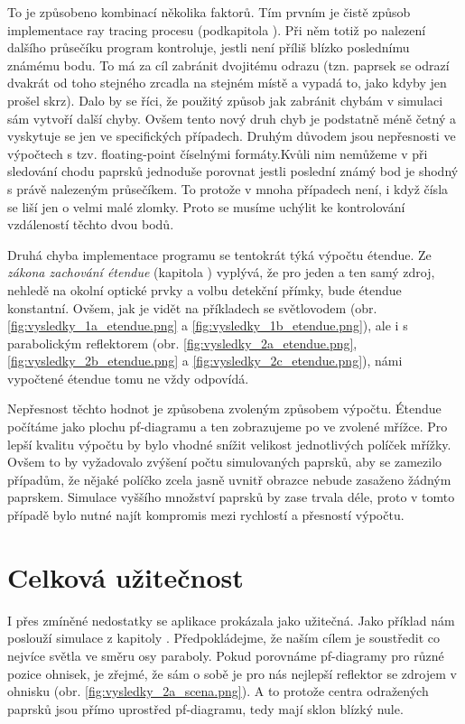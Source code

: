 To je způsobeno kombinací několika faktorů. Tím prvním je čistě způsob implementace ray tracing procesu (podkapitola ). Při něm totiž po nalezení dalšího průsečíku program kontroluje, jestli není příliš blízko poslednímu známému bodu. To má za cíl zabránit dvojitému odrazu (tzn. paprsek se odrazí dvakrát od toho stejného zrcadla na stejném místě a vypadá to, jako kdyby jen prošel skrz). Dalo by se říci, že použitý způsob jak zabránit chybám v simulaci sám vytvoří další chyby. Ovšem tento nový druh chyb je podstatně méně četný a vyskytuje se jen ve specifických případech. Druhým důvodem jsou nepřesnosti ve výpočtech s tzv. floating-point číselnými formáty.\src Kvůli nim nemůžeme v při sledování chodu paprsků jednoduše porovnat jestli poslední známý bod je shodný s právě nalezeným průsečíkem. To protože v mnoha případech není, i když čísla se liší jen o velmi malé zlomky. Proto se musíme uchýlit ke kontrolování vzdáleností těchto dvou bodů.

Druhá chyba implementace programu se tentokrát týká výpočtu étendue. Ze \emph{zákona zachování étendue} (kapitola ) vyplývá, že pro jeden a ten samý zdroj, nehledě na okolní optické prvky a volbu detekční přímky, bude étendue konstantní. Ovšem, jak je vidět na příkladech se světlovodem (obr. \ref{fig:vysledky_1a_etendue.png} a \ref{fig:vysledky_1b_etendue.png}), ale i s parabolickým reflektorem (obr. \ref{fig:vysledky_2a_etendue.png}, \ref{fig:vysledky_2b_etendue.png} a \ref{fig:vysledky_2c_etendue.png}), námi vypočtené étendue tomu ne vždy odpovídá.

Nepřesnost těchto hodnot je způsobena zvoleným způsobem výpočtu. Étendue počítáme jako plochu pf-diagramu a ten zobrazujeme po ve zvolené mřížce. Pro lepší kvalitu výpočtu by bylo vhodné snížit velikost jednotlivých políček mřížky. Ovšem to by vyžadovalo zvýšení počtu simulovaných paprsků, aby se zamezilo případům, že nějaké políčko zcela jasně uvnitř obrazce nebude zasaženo žádným paprskem. Simulace vyššího množství paprsků by zase trvala déle, proto v tomto případě bylo nutné najít kompromis mezi rychlostí a přesností výpočtu.


\section{Celková užitečnost}

I přes zmíněné nedostatky se aplikace prokázala jako užitečná. Jako příklad nám poslouží simulace z kapitoly . Předpokládejme, že naším cílem je soustředit co nejvíce světla ve směru osy paraboly. Pokud porovnáme pf-diagramy pro různé pozice ohnisek, je zřejmé, že sám o sobě je pro nás nejlepší reflektor se zdrojem v ohnisku (obr. \ref{fig:vysledky_2a_scena.png}). A to protože centra odražených paprsků jsou přímo uprostřed pf-diagramu, tedy mají sklon blízký nule.


